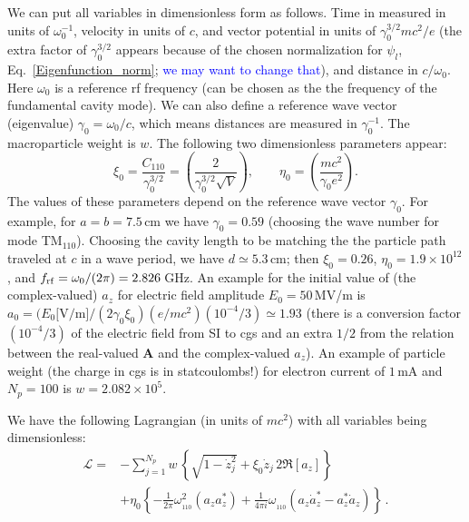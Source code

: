 \documentclass[11pt]{article}
\newcommand{\LL}{\mathcal{L}}
\begin{document}
We can put all variables in dimensionless form as follows. Time in measured in units of $\omega_0^{-1}$, 
velocity in units of $c$, and vector potential in units of $\gamma_0^{3/2}mc^2/e$ (the extra factor of $\gamma_0^{3/2}$
appears because of the chosen normalization for $\psi_l$, Eq.~\eqref{Eigenfunction_norm}; 
\textcolor{blue}{we may want to change that}), and distance in $c/\omega_0$. 
Here $\omega_0$ is a reference rf frequency (can be chosen as the the frequency of the fundamental cavity mode). 
We can also define a reference wave vector (eigenvalue) $\gamma_0=\omega_0/c$, which means distances
are measured in $\gamma_0^{-1}$. 
The macroparticle weight is $w$. The following two dimensionless parameters appear:
%
\begin{equation}
\xi_0 = \frac{C_{110}}{\gamma_0^{3/2}} = \left(\frac{2} {\gamma_0^{3/2}\sqrt{V}}\right), \qquad 
\eta_0 = \left(\frac{mc^2}{\gamma_0e^2} \right).
\label{dimensionless_parameters}
\end{equation}
%
The values of these parameters depend on the reference wave vector 
$\gamma_0$. For example, for $a=b=7.5\,$cm we have $\gamma_0=0.59$ (choosing the wave number for mode TM$_{110}$).
Choosing the cavity length to be matching the the particle path traveled at $c$ in a wave period, 
we have $d\simeq 5.3\,$cm; then $\xi_0=0.26$, $\eta_0=1.9\times 10^{12}$, and $f_{\rm rf}=\omega_0/(2\pi)=2.826\,$GHz. 
An example for the initial value of (the complex-valued) $a_z$ for electric field amplitude $E_0=50\,$MV/m is 
$a_0 = (E_0\mbox{[V/m]}/(2\gamma_0\xi_0)(e/mc^2)(10^{-4}/3)\simeq 1.93$ (there is a conversion factor $(10^{-4}/3)$ 
of the electric field from SI to cgs and an extra $1/2$ from the relation between 
the real-valued $\mathbf{A}$ and the complex-valued $a_z$).
An example of particle weight (the charge in cgs is in statcoulombs!) for electron current of $1\,$mA 
and $N_p=100$ is $w=2.082\times 10^5$.

We have the following Lagrangian (in units of $mc^2$) with all variables being dimensionless:
%
\begin{align}
\LL =& -\sum_{j=1}^{N_p} w\,\left\{\sqrt{1-\dot{z}_j^2}  + \xi_0
 \dot{z}_j\,2\Re[a_z] \right\} \nonumber\\
& + \eta_0 \left\{ - \frac{1}{2\pi}\omega_{_{110}}^2(a_z a_z^*)
+ \frac{1}{4\pi i} \omega_{_{110}} (a_z\dot{a}_z^* - a_z^*\dot{a}_z ) \right\}\, .
\label{L_dimensionless}
\end{align}
%
\end{document}
